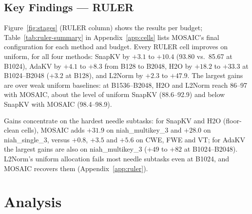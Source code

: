 \documentclass[11pt]{article}
\begin{document}
\subsection{Key Findings — RULER}
\label{sec:ruler}

Figure~\ref{fig:stages} (RULER column) shows the results per budget; Table~\ref{tab:ruler-summary} in Appendix~\ref{app:cells} lists MOSAIC's final configuration for each method and budget. Every RULER cell improves on uniform, for all four methods: SnapKV by $+3.1$ to $+10.4$ (93.80 vs.\ 85.67 at B1024), AdaKV by $+4.1$ to $+8.3$ from B128 to B2048, H2O by $+18.2$ to $+33.3$ at B1024--B2048 ($+3.2$ at B128), and L2Norm by $+2.3$ to $+47.9$. The largest gains are over weak uniform baselines: at B1536--B2048, H2O and L2Norm reach 86--97 with MOSAIC, about the level of uniform SnapKV (88.6--92.9) and below SnapKV with MOSAIC (98.4--98.9).

Gains concentrate on the hardest needle subtasks: for SnapKV and H2O (floor-clean cells), MOSAIC adds $+31.9$ on niah\_multikey\_3 and $+28.0$ on niah\_single\_3, versus $+0.8$, $+3.5$ and $+5.6$ on CWE, FWE and VT; for AdaKV the largest gains are also on niah\_multikey\_3 ($+49$ to $+82$ at B1024--B2048). L2Norm's uniform allocation fails most needle subtasks even at B1024, and MOSAIC recovers them (Appendix~\ref{app:ruler}).





\section{Analysis}

\end{document}
